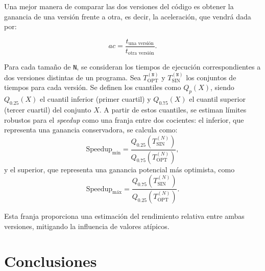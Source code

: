 \documentclass[11pt,a4paper,twoside]{article}
\theoremstyle{definition}
\begin{document}
	Una mejor manera de comparar las dos versiones del código es obtener la ganancia de una versión frente a otra, es decir, la aceleración, que vendrá dada por:
	
	\begin{equation} \label{eq:speedup}
		ac = \dfrac{t_{\text{una versión}}}{t_{\text{otra versión}}}.
	\end{equation}
	
	Para cada tamaño de \texttt{N}, se consideran los tiempos de ejecución correspondientes a dos versiones distintas de un programa. Sea \( T_{\mathrm{OPT}}^{(\texttt{N})} \) y \( T_{\mathrm{SIN}}^{(\texttt{N})} \) los conjuntos de tiempos para cada versión. Se definen los cuantiles como \( Q_p(X) \), siendo \( Q_{0.25}(X) \) el cuantil inferior (primer cuartil) y \( Q_{0.75}(X) \) el cuantil superior (tercer cuartil) del conjunto \( X \). A partir de estos cuantiles, se estiman límites robustos para el \textit{speedup} como una franja entre dos cocientes: el inferior, que representa una ganancia conservadora, se calcula como:
	\begin{equation}\label{q1}
		\text{Speedup}_{\text{mín}} = \frac{Q_{0.25}\left(T_{\mathrm{SIN}}^{(N)}\right)}{Q_{0.75}\left(T_{\mathrm{OPT}}^{(N)}\right)},
	\end{equation}
	y el superior, que representa una ganancia potencial más optimista, como
	\begin{equation} \label{q2}
		\text{Speedup}_{\text{máx}} = \frac{Q_{0.75}\left(T_{\mathrm{SIN}}^{(N)}\right)}{Q_{0.25}\left(T_{\mathrm{OPT}}^{(N)}\right)}.
	\end{equation}
	
	Esta franja proporciona una estimación del rendimiento relativa entre ambas versiones, mitigando la influencia de valores atípicos.
	
	
	\section{Conclusiones}


\printbibliography
	
	
\end{document}
